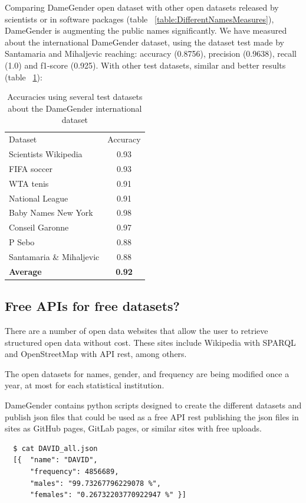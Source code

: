 \documentclass[a4paper]{article}
\begin{document}
Comparing DameGender open dataset with other open datasets released by
scientists or in software packages (table ~\ref{table:DifferentNamesMeasures}),
DameGender is augmenting the public names significantly.
We have measured about the international DameGender dataset,
using the dataset test made by Santamaria and Mihaljevic
\cite{10.7717/peerj-cs.156} reaching: accuracy (0.8756), precision
(0.9638), recall (1.0) and f1-score (0.925). With other test datasets,
similar and better results (table ~\ref{table:SeveralTests}):

\begin{table}[t]
  \footnotesize
  \begin{tabular}[]{lc}
    \hline
    Dataset & Accuracy  \tabularnewline
    Scientists Wikipedia & 0.93 \tabularnewline
    FIFA soccer & 0.93 \tabularnewline
    WTA tenis & 0.91 \tabularnewline
    National League & 0.91 \tabularnewline
    Baby Names New York & 0.98 \tabularnewline    
    Conseil Garonne & 0.97 \tabularnewline
    P Sebo\cite{sebo2021performance} & 0.88 \tabularnewline
    Santamaria \& Mihaljevic\cite{10.7717/peerj-cs.156} & 0.88 \tabularnewline
    \textbf{Average} & \textbf{0.92} \tabularnewline    
  \end{tabular}
  \caption{Accuracies using several test datasets about the DameGender international dataset}
  \label{table:SeveralTests}
\end{table}

\subsection{Free APIs for free datasets?}
\label{sec:freeapis}

There are a number of open data websites that allow the user to retrieve structured open data without cost. These sites include Wikipedia with SPARQL and OpenStreetMap with API rest, among others.

The open datasets for names, gender, and frequency are being modified once a year, at most for each statistical institution.

DameGender contains python scripts designed to create the
different datasets and publish json files that could be used as a free
API rest publishing the json files in sites as GitHub pages, GitLab
pages, or similar sites with free uploads.

\begin{verbatim}
  $ cat DAVID_all.json
  [{  "name": "DAVID",
      "frequency": 4856689,
      "males": "99.73267796229078 %",
      "females": "0.26732203770922947 %" }]
\end{verbatim}
\end{document}
